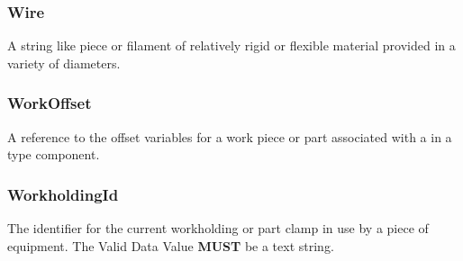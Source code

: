 \FloatBarrier
\FloatBarrier

\subsubsection{Wire}




A string like piece or filament of relatively rigid or flexible material provided in a variety of diameters.

\FloatBarrier

\subsubsection{WorkOffset}
\label{sec:WorkOffset}



A reference to the offset variables for a work piece or part associated with a  in a  type component.

\FloatBarrier

\subsubsection{WorkholdingId}
\label{sec:WorkholdingId}



The identifier for the current workholding or part clamp in use by a piece of equipment. 
 The \gls{Valid Data Value} \textbf{MUST} be a text string.

\FloatBarrier
